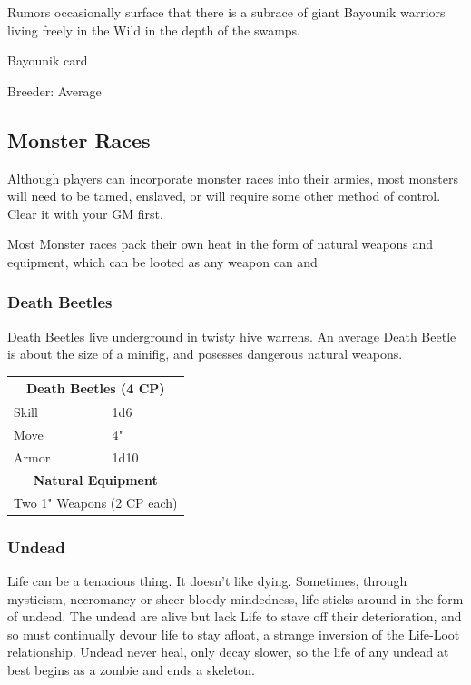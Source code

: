 \documentclass[12pt,a4paper,twocolumn]{article}
\begin{document}
Rumors occasionally surface that there is a subrace of giant Bayounik warriors living freely in the Wild in the depth of the swamps. 

Bayounik card

Breeder: Average

\subsection{Monster Races}

Although players can incorporate monster races into their armies, most monsters will need to be tamed, enslaved, or will require some other method of control.  Clear it with your GM first.

Most Monster races pack their own heat in the form of natural weapons and equipment, which can be looted as any weapon can and 

\subsubsection{Death Beetles}

Death Beetles live underground in twisty hive warrens.  An average Death Beetle is about the size of a minifig, and posesses dangerous natural weapons.

\begin{tabular}{|l|l|}
\multicolumn{2}{c}{\bf Death Beetles (4 CP) } \\ \hline
Skill & 1d6 \\ \hline
Move & 4" \\ \hline
Armor & 1d10 \\ \hline

\multicolumn{2}{c}{\bf Natural Equipment } \\ \hline
\multicolumn{2}{c}{ Two 1" Weapons (2 CP each) } \\ \hline
\end{tabular}

\subsubsection{Undead}

Life can be a tenacious thing.  It doesn't like dying.  Sometimes, through mysticism, necromancy or sheer bloody mindedness, life sticks around in the form of undead.  The undead are alive but lack Life to stave off their deterioration, and so must continually devour life to stay afloat, a strange inversion of the Life-Loot relationship.  Undead never heal, only decay slower, so the life of any undead at best begins as a zombie and ends a skeleton.
\end{document}
